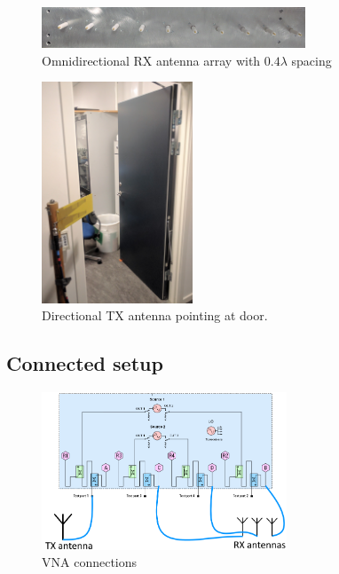 \begin{figure}[H]
\centering
\includegraphics[width=0.7\textwidth]{pictures/Measurement/antenna_array.jpg}
    \caption{Omnidirectional RX antenna array with $0.4 \lambda$ spacing}
    \label{DirAnt}
\end{figure}
\begin{figure}[H]
\centering
\includegraphics[width=0.4\textwidth]{pictures/Measurement/antenna_door.jpg}
\caption{Directional TX antenna pointing at door.}
\end{figure}



\subsection{Connected setup}
\label{connected_setup}

\begin{figure}[H]
\centering
\includegraphics[width=0.65\textwidth]{figures/Gimp_figures/4portVNA.png}
\caption{VNA connections}
\label{connection_diagram}
\end{figure}

